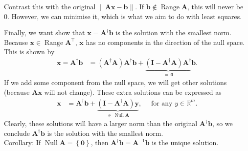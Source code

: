 \documentclass[12pt,a4paper]{article} %
\DeclareMathOperator{\Range}{Range}
\DeclareMathOperator{\Null}{Null}
\begin{document}
Contrast this with the original $\| \mathbf A \bm x - \bm b \|$. If $\bm b \notin \Range \mathbf A$, this will never be 0.
However, we can minimise it, which is what we aim to do with least squares. 

Finally, we want show that $\bm x = \mathbf A^\dagger \bm b$ 
is the solution with the smallest norm. Because $\bm x \in \Range \mathbf A^\top$, 
$\bm x$ has no components in the direction of  the null space. This is shown by 
\begin{align*}
    \bm x=\mathbf A^\dagger \bm b &= (\mathbf A^\dagger \mathbf A)\mathbf A^\dagger\bm b + \underbrace{(\mathbf I - \mathbf A^\dagger \mathbf A)\mathbf A^\dagger}_{=\,\bm 0}\bm b.
\end{align*}
If we add some component from the null space, we will get other solutions (because $\mathbf A \bm x$ will not change). 
These extra solutions can be expressed as
\begin{align*}
    \bm x &= \mathbf A^\dagger\bm b + \underbrace{(\mathbf I - \mathbf A^\dagger \mathbf A)\bm y}_{\in \,\Null \mathbf A}, \quad \text{ for any }y \in \mathbb R^m.
\end{align*}
Clearly, these solutions will have a larger norm than the original $\mathbf A^\dagger \bm b$, so we conclude 
$\mathbf A^\dagger \bm b$  is the solution with the smallest norm. \\[1em]
Corollary: If $\Null \mathbf A = \left\{ \bm 0\right\}$, then $\mathbf A^\dagger \bm b = \mathbf A^{-1} \bm b$ is the unique solution.
\end{document}
